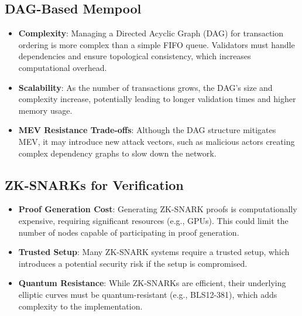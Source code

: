 \documentclass[12pt]{article}
\begin{document}



\subsection{DAG-Based Mempool}

\begin{itemize}

\item \textbf{Complexity}: Managing a Directed Acyclic Graph (DAG) for transaction ordering is more complex than a simple FIFO queue. Validators must handle dependencies and ensure topological consistency, which increases computational overhead.

\item \textbf{Scalability}: As the number of transactions grows, the DAG's size and complexity increase, potentially leading to longer validation times and higher memory usage.

\item \textbf{MEV Resistance Trade-offs}: Although the DAG structure mitigates MEV, it may introduce new attack vectors, such as malicious actors creating complex dependency graphs to slow down the network.

\end{itemize}

\subsection{ZK-SNARKs for Verification}
\begin{itemize}
    \item \textbf{Proof Generation Cost}: Generating ZK-SNARK proofs is computationally expensive, requiring significant resources (e.g., GPUs). This could limit the number of nodes capable of participating in proof generation.

    \item \textbf{Trusted Setup}: Many ZK-SNARK systems require a trusted setup, which introduces a potential security risk if the setup is compromised.

    \item \textbf{Quantum Resistance}: While ZK-SNARKs are efficient, their underlying elliptic curves must be quantum-resistant (e.g., BLS12-381), which adds complexity to the implementation.
\end{itemize}


\nocite{*}
\printbibliography
\end{document}
